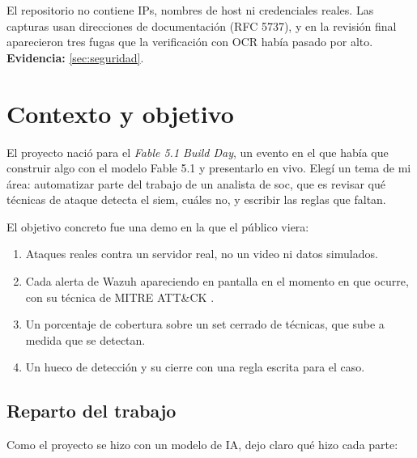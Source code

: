 \documentclass{mapc-proyecto}
\begin{document}
\begin{hallazgo}
El repositorio no contiene IPs, nombres de host ni credenciales reales. Las
capturas usan direcciones de documentación (RFC 5737), y en la revisión final
aparecieron tres fugas que la verificación con OCR había pasado por alto.\\[3pt]
\textbf{Evidencia:} \cref{sec:seguridad}.
\end{hallazgo}

\newpage
\tableofcontents
\newpage

\section{Contexto y objetivo}

El proyecto nació para el \emph{Fable 5.1 Build Day}, un evento en el que había
que construir algo con el modelo Fable 5.1 y presentarlo en vivo. Elegí un tema
de mi área: automatizar parte del trabajo de un analista de \gls{soc}, que es
revisar qué técnicas de ataque detecta el \gls{siem}, cuáles no, y escribir las
reglas que faltan.

El objetivo concreto fue una demo en la que el público viera:

\begin{enumerate}
  \item Ataques reales contra un servidor real, no un video ni datos simulados.
  \item Cada alerta de Wazuh apareciendo en pantalla en el momento en que ocurre,
        con su técnica de MITRE ATT\&CK \parencite{mitre-attack}.
  \item Un porcentaje de cobertura sobre un set cerrado de técnicas, que sube a
        medida que se detectan.
  \item Un hueco de detección y su cierre con una regla escrita para el caso.
\end{enumerate}

\subsection{Reparto del trabajo}

Como el proyecto se hizo con un modelo de IA, dejo claro qué hizo cada parte:
\end{document}
